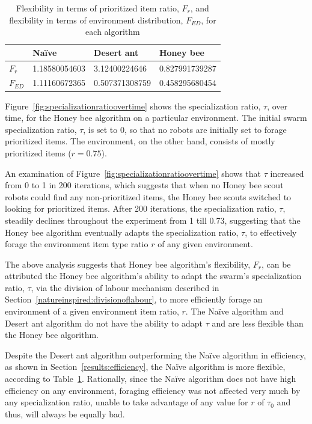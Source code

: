  
\begin{table}[]
\centering
\caption{Flexibility in terms of prioritized item ratio, $F_r$, and flexibility in terms of environment distribution, $F_{ED}$, for each algorithm}
\label{table:flexibility}
\begin{tabular}{@{}llll@{}}
\toprule
\textbf{}         & Na\"ive         & Desert ant        & Honey bee         \\ \midrule
\textbf{$F_r$}    & 1.18580054603 & 3.12400224646     & 0.827991739287    \\ \midrule
\textbf{$F_{ED}$} & 1.11160672365 & 0.507371308759 & 0.458295680454 
\end{tabular}
\end{table}



Figure~\ref{fig:specializationratioovertime} shows the specialization ratio, $\tau$, over time, for the Honey bee algorithm on a particular environment. The initial swarm specialization ratio, $\tau$, is set to 0, so that no robots are initially set to forage prioritized items. The environment, on the other hand, consists of mostly prioritized items ($r=0.75$). 

An examination of Figure~\ref{fig:specializationratioovertime} shows that $\tau$ increased from 0 to 1 in 200 iterations, which suggests that when no Honey bee scout robots could find any non-prioritized items, the Honey bee scouts switched to looking for prioritized items. After 200 iterations, the specialization ratio, $\tau$, steadily declines throughout the experiment from 1 till 0.73, suggesting that the Honey bee algorithm eventually adapts the specialization ratio, $\tau$, to effectively forage the environment item type ratio $r$ of any given environment.

The above analysis suggests that Honey bee algorithm's flexibility, $F_r$, can be attributed the Honey bee algorithm's ability to adapt the swarm's specialization ratio, $\tau$, via the division of labour mechanism described in Section~\ref{natureinspired:divisionoflabour}, to more efficiently forage an environment of a given environment item ratio, $r$. The Na\"ive algorithm and Desert ant algorithm do not have the ability to adapt $\tau$ and are less flexible than the Honey bee algorithm.

Despite the Desert ant algorithm outperforming the Na\"ive algorithm in efficiency, as shown in Section~\ref{results:efficiency}, the Na\"ive algorithm is more flexible, according to Table~\ref{table:flexibility}. Rationally, since the Na\"ive algorithm does not have high efficiency on any environment, foraging efficiency was not affected very much by any specialization ratio, unable to take advantage of any value for $r$ of $\tau_0$ and thus, will always be equally bad.

